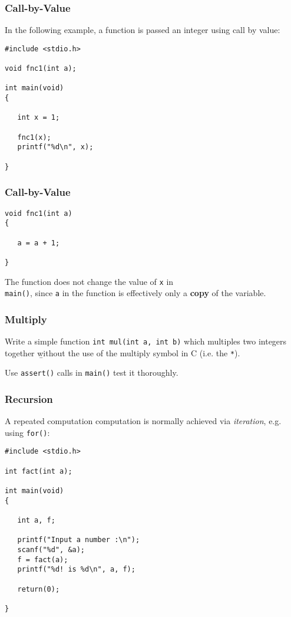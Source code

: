 \begin{frame}[fragile]
\frametitle{Call-by-Value}

In the following example, a function is passed an integer
using call by value:

\begin{verbatim}
#include <stdio.h>

void fnc1(int a);

int main(void)
{

   int x = 1;

   fnc1(x);
   printf("%d\n", x);

}
\end{verbatim}
\end{frame}


\begin{frame}[fragile]
\frametitle{Call-by-Value}
\begin{verbatim}
void fnc1(int a)
{

   a = a + 1;

}
\end{verbatim}

The function does not change the value of \verb^x^ in\\
\verb^main()^, since \verb^a^ in the function is effectively
only a {\bf copy} of the variable.
\end{frame}

\begin{frame}[fragile]
\frametitle{Multiply}
Write a simple function \verb^int mul(int a, int b)^ which
multiples two integers together {\b without} the use of the
multiply symbol in C (i.e. the \verb^*^).

Use \verb^assert()^ calls in \verb^main()^ test it thoroughly.
\end{frame}

\begin{frame}[fragile]
\frametitle{Recursion}

A repeated computation computation is normally
achieved via {\it iteration}, e.g. using \verb^for()^:

\begin{verbatim}
#include <stdio.h>

int fact(int a);

int main(void)
{

   int a, f;

   printf("Input a number :\n");
   scanf("%d", &a);
   f = fact(a);
   printf("%d! is %d\n", a, f);

   return(0);

}
\end{verbatim}
\end{frame}

